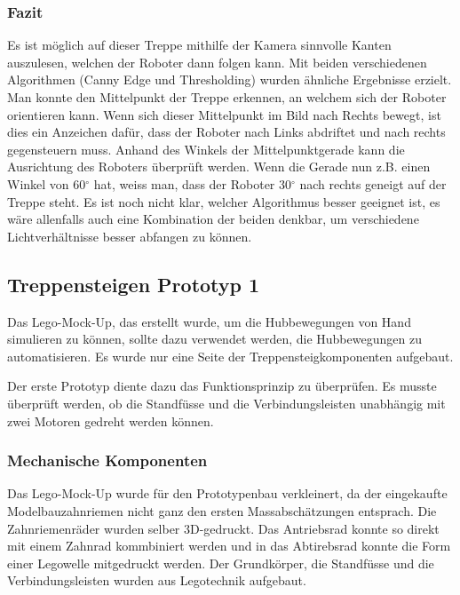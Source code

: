 \subsubsection{Fazit}
Es ist möglich auf dieser Treppe mithilfe der Kamera sinnvolle Kanten auszulesen, welchen der Roboter dann folgen kann. Mit beiden verschiedenen Algorithmen (Canny Edge und Thresholding) wurden ähnliche Ergebnisse erzielt. Man konnte den Mittelpunkt der Treppe erkennen, an welchem sich der Roboter orientieren kann. Wenn sich dieser Mittelpunkt im Bild nach Rechts bewegt, ist dies ein Anzeichen dafür, dass der Roboter nach Links abdriftet und nach rechts gegensteuern muss. Anhand des Winkels der Mittelpunktgerade kann die Ausrichtung des Roboters überprüft werden. Wenn die Gerade nun z.B. einen Winkel von 60$^\circ$
 hat, weiss man, dass der Roboter 30$^\circ$ nach rechts geneigt auf der Treppe steht.
Es ist noch nicht klar, welcher Algorithmus besser geeignet ist, es wäre allenfalls auch eine Kombination der beiden denkbar, um verschiedene Lichtverhältnisse besser abfangen zu können.

\newpage
\subsection{Treppensteigen Prototyp 1}
Das Lego-Mock-Up, das erstellt wurde, um die Hubbewegungen von Hand simulieren zu können, sollte dazu verwendet werden, die Hubbewegungen zu automatisieren. Es wurde nur eine Seite der Treppensteigkomponenten aufgebaut. 

Der erste Prototyp diente dazu das Funktionsprinzip zu überprüfen. Es musste überprüft werden, ob die Standfüsse und die Verbindungsleisten unabhängig mit zwei Motoren gedreht werden können. 

\subsubsection{Mechanische Komponenten}
Das Lego-Mock-Up wurde für den Prototypenbau verkleinert, da der eingekaufte Modelbauzahnriemen nicht ganz den ersten Massabschätzungen entsprach. Die Zahnriemenräder wurden selber 3D-gedruckt. Das Antriebsrad konnte so direkt mit einem Zahnrad kommbiniert werden und in das Abtirebsrad konnte die Form einer Legowelle mitgedruckt werden. Der Grundkörper, die Standfüsse und die Verbindungsleisten wurden aus Legotechnik aufgebaut.\\

